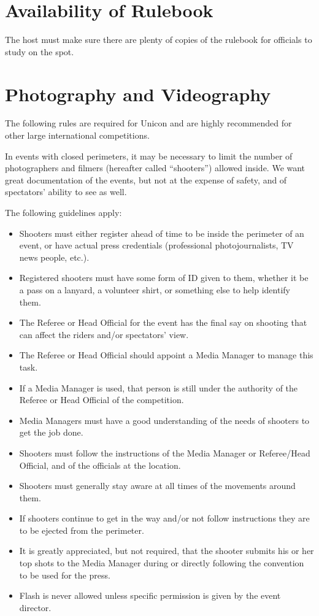 \section{Availability of Rulebook}
The host must make sure there are plenty of copies of the rulebook for officials to study on the spot.

\section{Photography and Videography}
The following rules are required for Unicon and are highly recommended for other large international competitions.

In events with closed perimeters, it may be necessary to limit the number of photographers and filmers (hereafter called ``shooters'') allowed inside.
We want great documentation of the events, but not at the expense of safety, and of spectators' ability to see as well.

The following guidelines apply:
\begin{itemize}
\item Shooters must either register ahead of time to be inside the perimeter of an event, or have actual press credentials (professional photojournalists, TV news people, etc.).
\item Registered shooters must have some form of ID given to them, whether it be a pass on a lanyard, a volunteer shirt, or something else to help identify them.
\item The Referee or Head Official for the event has the final say on shooting that can affect the riders and/or spectators' view.
\item The Referee or Head Official should appoint a Media Manager to manage this task.
\item If a Media Manager is used, that person is still under the authority of the Referee or Head Official of the competition.
\item Media Managers must have a good understanding of the needs of shooters to get the job done.
\item Shooters must follow the instructions of the Media Manager or Referee/Head Official, and of the officials at the location.
\item Shooters must generally stay aware at all times of the movements around them.
\item If shooters continue to get in the way and/or not follow instructions they are to be ejected from the perimeter.
\item It is greatly appreciated, but not required, that the shooter submits his or her top shots to the Media Manager during or directly following the convention to be used for the press.
\item Flash is never allowed unless specific permission is given by the event director.
\end{itemize}

